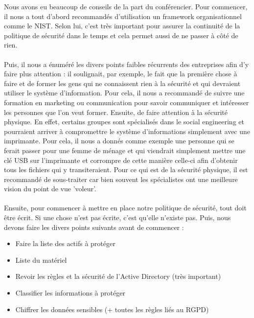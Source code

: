 \documentclass[a4paper]{article}
\begin{document}
Nous avons eu beaucoup de conseils de la part du conférencier. Pour commencer, il nous a tout d'abord recommandés d'utilisation un framework organisationnel comme le NIST. Selon lui, c'est très important pour assurer la continuité de la politique de sécurité dans le temps et cela permet aussi de ne passer à côté de rien.\\\\
Puis, il nous a énuméré les divers points faibles récurrents des entreprises afin d'y faire plus attention : il soulignait, par exemple, le fait que la première chose à faire et de former les gens qui ne connaissent rien à la sécurité et qui devraient utiliser le système d'information. Pour cela, il nous a recommandé de suivre une formation en marketing ou communication pour savoir communiquer et intéresser les personnes que l'on veut former. Ensuite, de faire attention à la sécurité physique. En effet, certains groupes sont spécialisés dans le social engineering et pourraient arriver à compromettre le système d'informations simplement avec une imprimante. Pour cela, il nous a donnés comme exemple une personne qui se ferait passer pour une femme de ménage et qui viendrait simplement mettre une clé USB sur l'imprimante et corrompre de cette manière celle-ci afin d'obtenir tous les fichiers qui y transiteraient. Pour ce qui est de la sécurité physique, il est recommandé de sous-traiter car bien souvent les spécialistes ont une meilleure vision du point de vue 'voleur'.\\\\
Ensuite, pour commencer à mettre en place notre politique de sécurité, tout doit être écrit. Si une chose n'est pas écrite, c'est qu'elle n'existe pas. Puis, nous devons faire les divers points suivants avant de commencer : \begin{itemize}
    \item Faire la liste des actifs à protéger
    \item Liste du matériel
    \item Revoir les règles et la sécurité de l'Active Directory (très important)
    \item Classifier les informations à protéger
    \item Chiffrer les données sensibles (+ toutes les règles liés au RGPD)\\
\end{itemize}
\end{document}
